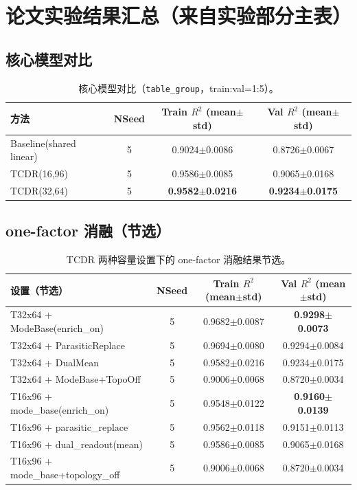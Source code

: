 \documentclass[12pt,a4paper]{ctexart}
\begin{document}
\section{论文实验结果汇总（来自实验部分主表）}
\subsection{核心模型对比}
\begin{table}[htbp]
\centering
\small
\setlength{\tabcolsep}{5pt}
\begin{tabular}{lccc}
\toprule
方法 & NSeed & Train $R^2$ (mean$\pm$std) & Val $R^2$ (mean$\pm$std) \\
\midrule
Baseline(shared linear) & 5 & 0.9024$\pm$0.0086 & 0.8726$\pm$0.0067 \\
TCDR(16,96) & 5 & 0.9586$\pm$0.0085 & 0.9065$\pm$0.0168 \\
TCDR(32,64) & 5 & \textbf{0.9582$\pm$0.0216} & \textbf{0.9234$\pm$0.0175} \\
\bottomrule
\end{tabular}
\caption{核心模型对比（\texttt{table\_group}，train:val=1:5）。}
\end{table}

\subsection{one-factor 消融（节选）}
\begin{table}[htbp]
\centering
\scriptsize
\setlength{\tabcolsep}{4pt}
\begin{tabularx}{\textwidth}{l c c c}
\toprule
设置（节选） & NSeed & Train $R^2$ (mean$\pm$std) & Val $R^2$ (mean$\pm$std) \\
\midrule
T32x64 + ModeBase(enrich\_on) & 5 & 0.9682$\pm$0.0087 & \textbf{0.9298$\pm$0.0073} \\
T32x64 + ParasiticReplace & 5 & 0.9694$\pm$0.0080 & 0.9294$\pm$0.0084 \\
T32x64 + DualMean & 5 & 0.9582$\pm$0.0216 & 0.9234$\pm$0.0175 \\
T32x64 + ModeBase+TopoOff & 5 & 0.9006$\pm$0.0068 & 0.8720$\pm$0.0034 \\
\midrule
T16x96 + mode\_base(enrich\_on) & 5 & 0.9548$\pm$0.0122 & \textbf{0.9160$\pm$0.0139} \\
T16x96 + parasitic\_replace & 5 & 0.9562$\pm$0.0118 & 0.9151$\pm$0.0113 \\
T16x96 + dual\_readout(mean) & 5 & 0.9586$\pm$0.0085 & 0.9065$\pm$0.0168 \\
T16x96 + mode\_base+topology\_off & 5 & 0.9006$\pm$0.0068 & 0.8720$\pm$0.0034 \\
\bottomrule
\end{tabularx}
\caption{TCDR 两种容量设置下的 one-factor 消融结果节选。}
\end{table}
\end{document}
